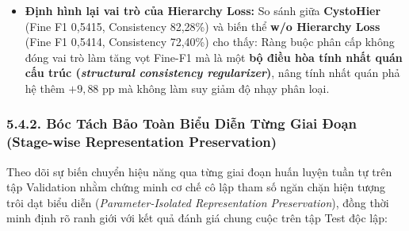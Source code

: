 \documentclass[
  10pt,
  a4paper,
  twocolumn]{article}
\providecommand{\tightlist}{%
  \setlength{\itemsep}{0pt}\setlength{\parskip}{0pt}}
\begin{document}
\begin{itemize}
\tightlist
\item
  \textbf{Định hình lại vai trò của Hierarchy Loss:} So sánh giữa
  \textbf{CystoHier} (Fine F1 0,5415, Consistency 82,28\%) và biến thể
  \textbf{w/o Hierarchy Loss} (Fine F1 0,5414, Consistency 72,40\%) cho
  thấy: Ràng buộc phân cấp không đóng vai trò làm tăng vọt Fine-F1 mà là
  một \textbf{bộ điều hòa tính nhất quán cấu trúc (\emph{structural
  consistency regularizer})}, nâng tính nhất quán phả hệ thêm
  \(+9{,}88\) pp mà không làm suy giảm độ nhạy phân loại.
\end{itemize}

\subsubsection{5.4.2. Bóc Tách Bảo Toàn Biểu Diễn Từng Giai Đoạn
(Stage-wise Representation
Preservation)}\label{buxf3c-tuxe1ch-bux1ea3o-touxe0n-biux1ec3u-diux1ec5n-tux1eebng-giai-ux111oux1ea1n-stage-wise-representation-preservation}

Theo dõi sự biến chuyển hiệu năng qua từng giai đoạn huấn luyện tuần tự
trên tập Validation nhằm chứng minh cơ chế cô lập tham số ngăn chặn hiện
tượng trôi dạt biểu diễn (\emph{Parameter-Isolated Representation
Preservation}), đồng thời minh định rõ ranh giới với kết quả đánh giá
chung cuộc trên tập Test độc lập:

\begin{table}[htbp]
\centering
\caption{Hiệu năng chi tiết theo từng lớp thô (per-class coarse metrics) của mô hình phân cấp.}
\label{tab:table9}
\vspace{2pt}
\end{table}
\end{document}
